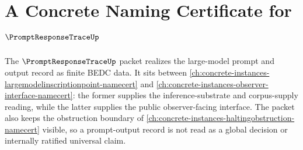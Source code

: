 \chapter{A Concrete Naming Certificate for $\PromptResponseTraceUp$}
\label{ch:concrete-instances-prompt-response-trace-namecert}

The $\PromptResponseTraceUp$ packet realizes the large-model prompt and output record as finite BEDC data. It sits between \autoref{ch:concrete-instances-largemodelinscriptionpoint-namecert} and \autoref{ch:concrete-instances-observer-interface-namecert}: the former supplies the inference-substrate and corpus-supply reading, while the latter supplies the public observer-facing interface. The packet also keeps the obstruction boundary of \autoref{ch:concrete-instances-haltingobstruction-namecert} visible, so a prompt-output record is not read as a global decision or internally ratified universal claim.

